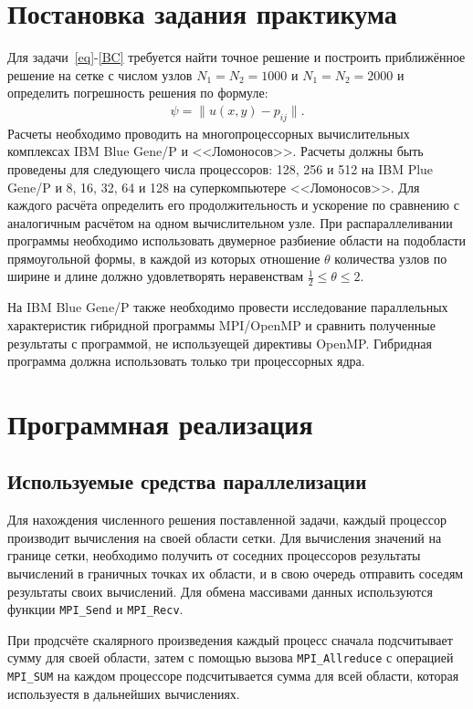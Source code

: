 \documentclass[11pt]{article}
\numberwithin{equation}{section}
\theoremstyle{plain}
\theoremstyle{definition}
\begin{document}
\section{Постановка задания практикума}
Для задачи~\eqref{eq}-\eqref{BC} требуется найти точное решение и построить
приближённое решение на сетке с числом узлов $N_1 = N_2 = 1000$ и
$N_1 = N_2 = 2000$ и определить погрешность решения по формуле:
\[\begin{aligned}
    \psi=\|u(x,y)-p_{ij}\|.
\end{aligned}\]
Расчеты необходимо проводить на многопроцессорных вычислительных комплексах IBM
Blue Gene/P и <<Ломоносов>>.
Расчеты должны быть проведены для следующего числа процессоров: 128, 256 и 512 на
IBM Plue Gene/P и  8, 16, 32, 64 и 128 на суперкомпьютере <<Ломоносов>>.
Для каждого расчёта определить его
продолжительность и ускорение по сравнению с аналогичным расчётом на одном
вычислительном узле.  При распараллеливании программы необходимо использовать
двумерное разбиение области на подобласти прямоугольной формы, в каждой из
которых отношение $\theta$ количества узлов по ширине и длине должно удовлетворять
неравенствам $\frac{1}{2} \leqslant \theta \leqslant 2$.

На IBM Blue Gene/P также необходимо провести исследование параллельных
характеристик гибридной программы MPI/OpenMP и сравнить полученные результаты с
программой, не используещей директивы OpenMP. Гибридная программа должна
использовать только три процессорных ядра.

\section{Программная реализация}
\subsection{Используемые средства параллелизации}
Для нахождения численного решения поставленной задачи, каждый процессор
производит вычисления на своей области сетки. Для вычисления значений на
границе сетки, необходимо получить от соседних процессоров результаты вычислений
в граничных точках их области, и в свою очередь отправить соседям результаты
своих вычислений. Для обмена массивами данных используются функции
\verb|MPI_Send| и \verb|MPI_Recv|.

При продсчёте скалярного произведения каждый процесс сначала подсчитывает сумму
для своей области, затем с помощью вызова \verb|MPI_Allreduce| с операцией
\verb|MPI_SUM| на каждом процессоре подсчитывается сумма для всей области,
которая используестя в дальнейших вычислениях.
\end{document}
